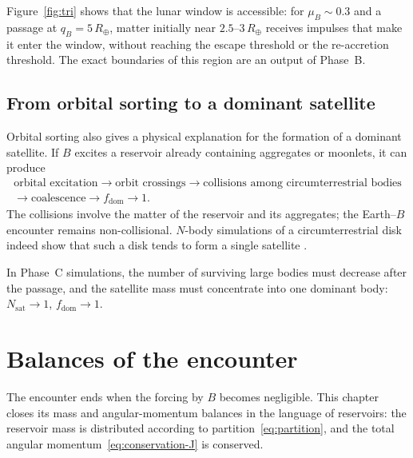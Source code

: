 \documentclass[11pt,a4paper,openany]{report}
\newcommand{\Rt}{R_{\oplus}}
\begin{document}
\begin{controle}
Figure~\ref{fig:tri} shows that the lunar window is accessible: for $\mu_B\sim0.3$ and a passage at
$q_B=5\,\Rt$, matter initially near $2.5$--$3\,\Rt$ receives impulses that make it enter the window,
without reaching the escape threshold or the re-accretion threshold. The exact boundaries of this
region are an output of Phase~B.
\end{controle}

\section{From orbital sorting to a dominant satellite}

Orbital sorting also gives a physical explanation for the formation of a dominant satellite. If
$B$ excites a reservoir already containing aggregates or moonlets, it can produce
\begin{equation}
\begin{gathered}
\text{orbital excitation}\rightarrow\text{orbit crossings}\rightarrow
\text{collisions among circumterrestrial bodies}\\
\rightarrow\text{coalescence}\rightarrow f_{\mathrm{dom}}\rightarrow1.
\end{gathered}
\label{eq:chaine-dominance}
\end{equation}
The collisions involve the matter of the reservoir and its aggregates; the Earth--$B$ encounter
remains non-collisional. $N$-body simulations of a circumterrestrial disk indeed show that such a
disk tends to form a single satellite \cite{Kokubo2000}.

\begin{consequence}
In Phase~C simulations, the number of surviving large bodies must decrease after the passage, and
the satellite mass must concentrate into one dominant body: $N_{\mathrm{sat}}\to1$,
$f_{\mathrm{dom}}\to1$.
\end{consequence}

\chapter{Balances of the encounter}
\label{ch:bilans}

The encounter ends when the forcing by $B$ becomes negligible. This chapter closes its mass and
angular-momentum balances in the language of reservoirs: the reservoir mass is distributed
according to partition~\eqref{eq:partition}, and the total angular momentum~\eqref{eq:conservation-J}
is conserved.
\end{document}
